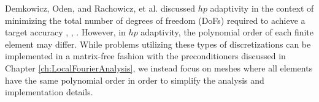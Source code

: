 Demkowicz, Oden, and Rachowicz, et al. discussed $hp$ adaptivity in the context of minimizing the total number of degrees of freedom (DoFs) required to achieve a target accuracy \cite{demkowicz1989toward}, \cite{oden1989toward}, \cite{rachowicz1989toward}.
However, in $hp$ adaptivity, the polynomial order of each finite element may differ.
While problems utilizing these types of discretizations can be implemented in a matrix-free fashion with the preconditioners discussed in Chapter \ref{ch:LocalFourierAnalysis}, we instead focus on meshes where all elements have the same polynomial order in order to simplify the analysis and implementation details.
